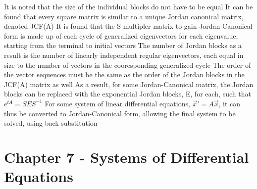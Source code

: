 \documentclass[11 pt, twoside]{article}
\newenvironment{outline*}
{
	\begin{outline}[enumerate]
	}
	{\end{outline}
}
\begin{document}
\begin{outline*}
\3 It is noted that the size of the individual blocks do not have to be equal
\2 It can be found that every square matrix is similar to a unique Jordan canonical matrix, denoted JCF(A)
\2 It is found that the S multipler matrix to gain Jordan-Canonical form is made up of each cycle of generalized eigenvectors for each eigenvalue, starting from the terminal to initial vectors
\3 The number of Jordan blocks as a result is the number of linearly independent regular eigenvectors, each equal in size to the number of vectors in the cooresponding generalized cycle
\3 The order of the vector sequences must be the same as the order of the Jordan blocks in the JCF(A) matrix as well
\2 As a result, for some Jordan-Canonical matrix, the Jordan blocks can be replaced with the exponential Jordan blocks, E, for each, such that $e^{tA} = SES^{-1}$
\1 For some system of linear differential equations, $\vec{x}' = A\vec{x}$, it can thus be converted to Jordan-Canonical form, allowing the final system to be solved, using back substitution
\end{outline*}
\section{Chapter 7 - Systems of Differential Equations}
\end{document}
